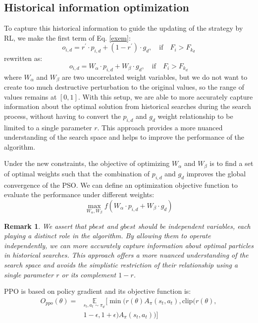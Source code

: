 \documentclass[review]{elsarticle}
\newtheorem{remark}{Remark}
\begin{document}
\subsection{Historical information optimization}
To capture this historical information to guide the updating of the strategy by RL, we make the first term of Eq. \eqref{exem}:
\begin{equation}
		o_{i,d}=r^{\prime}\cdot p_{i,d}+(1-r^{\prime})\cdot g_{d},\quad \text{if}\quad F_{i}>F_{k_{d}}
\end{equation}
rewritten as:
\begin{equation}
		o_{i,d}=W_{\alpha}\cdot p_{i,d}+W_{\beta}\cdot g_{d},\quad \text{if}\quad F_{i}>F_{k_{d}}
\end{equation}
where $W_{\alpha}$ and $W_{\beta}$ are two uncorrelated weight variables, but we do not want to create too much destructive perturbation to the original values, so the range of values remains at $[0, 1]$. With this setup, we are able to more accurately capture information about the optimal solution from historical searches during the search process, without having to convert the $ p_{i,d}$ and $g_{d}$ weight relationship to be limited to a single parameter $r$. This approach provides a more nuanced understanding of the search space and helps to improve the performance of the algorithm.
	
Under the new constraints, the objective of optimizing $W_{\alpha}$ and $W_{\beta}$ is to find a set of optimal weights such that the combination of $ p_{i,d}$ and $g_{d}$ improves the global convergence of the PSO. We can define an optimization objective function to evaluate the performance under different weights:
\begin{equation}
\max_{W_{\alpha}, W_{\beta}} f(W_{\alpha} \cdot p_{i,d} + W_{\beta} \cdot g_{d})
\end{equation}
\begin{remark}
	\emph{We assert that $pbest$ and $gbest$ should be independent variables, each playing a distinct role in the algorithm. By allowing them to operate independently, we can more accurately capture information about optimal particles in historical searches. This approach offers a more nuanced understanding of the search space and avoids the simplistic restriction of their relationship using a single parameter $r$ or its complement $1-r$.}
\end{remark}

PPO is based on policy gradient and its objective function is:
\begin{equation}
	\begin{split}
	O_{ppo}(\theta) = & \underset{s_{t}, a_{t} \sim \pi_{\theta^{\prime}}}{\mathbb{E}} [\min( r(\theta)A_{\pi}(s_{t},a_{t}),\text{clip}(r(\theta),\\
	&1-\epsilon,1+\epsilon)A_{\pi}(s_{t}, a_{t}))]
	\end{split}
\end{equation}
\end{document}
